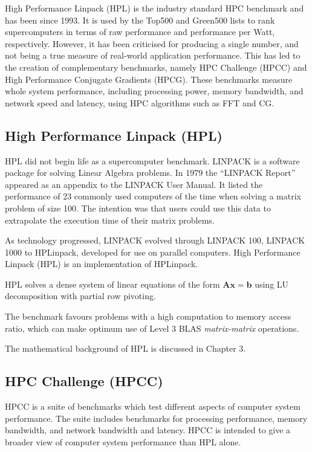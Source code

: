 High Performance Linpack (HPL) is the industry standard HPC benchmark and has been since 1993. It is used by the Top500 and Green500 lists to rank supercomputers in terms of raw performance and performance per Watt, respectively. However, it has been criticised for producing a single number, and not being a true measure of real-world application performance. This has led to the creation of complementary benchmarks, namely HPC Challenge (HPCC) and High Performance Conjugate Gradients (HPCG). These benchmarks measure whole system performance, including processing power, memory bandwidth, and network speed and latency, using HPC algorithms such as FFT and CG.


%
%
\subsection{High Performance Linpack (HPL)}

HPL did not begin life as a supercomputer benchmark. LINPACK is a software package for solving Linear Algebra problems. In 1979 the ``LINPACK Report'' appeared as an appendix to the LINPACK User Manual. It listed the performance of 23 commonly used computers of the time when solving a matrix problem of size 100. The intention was that users could use this data to extrapolate the execution time of their matrix problems.

As technology progressed, LINPACK evolved through LINPACK 100, LINPACK 1000 to HPLinpack, developed for use on parallel computers. High Performance Linpack (HPL) is an implementation of HPLinpack.

HPL solves a dense system of linear equations of the form $\mathbf{Ax} = \mathbf{b}$ using LU decomposition with partial row pivoting.

The benchmark favours problems with a high computation to memory access ratio, which can make optimum use of Level 3 BLAS \emph{matrix-matrix} operations.

The mathematical background of HPL is discussed in Chapter 3.


%
%
\subsection{HPC Challenge (HPCC)}

HPCC is a suite of benchmarks which test different aspects of computer system performance. The suite includes benchmarks for processing performance, memory bandwidth, and network bandwidth and latency. HPCC is intended to give a broader view of computer system performance than HPL alone.

